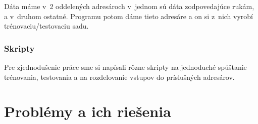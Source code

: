 Dáta máme v~2 oddelených adresároch v~jednom sú dáta zodpovedajúce rukám, a v~druhom ostatné. Programu potom dáme tieto adresáre a on si z~nich vyrobí trénovaciu/testovaciu sadu.

\todo

\subsubsection{Skripty}
Pre zjednodušenie práce sme si napísali rôzne skripty na jednoduché spúštanie trénovania, testovania a na rozdelovanie vstupov do príslušných adresárov.
\todo

\section{Problémy a ich riešenia}
\todo